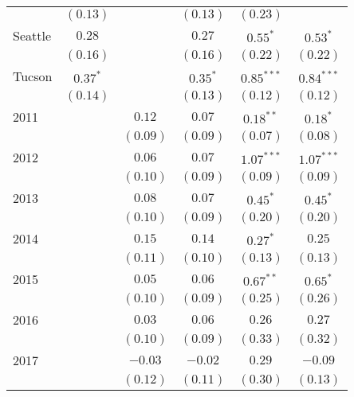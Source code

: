 \begin{table}[ht!]
\begin{center}
\begin{tabular}{l c c c c c}
                           & $(0.13)$    &              & $(0.13)$    & $(0.23)$     &              \\
Seattle                    & $0.28$      &              & $0.27$      & $0.55^{*}$   & $0.53^{*}$   \\
                           & $(0.16)$    &              & $(0.16)$    & $(0.22)$     & $(0.22)$     \\
Tucson                     & $0.37^{*}$  &              & $0.35^{*}$  & $0.85^{***}$ & $0.84^{***}$ \\
                           & $(0.14)$    &              & $(0.13)$    & $(0.12)$     & $(0.12)$     \\
2011                       &             & $0.12$       & $0.07$      & $0.18^{**}$  & $0.18^{*}$   \\
                           &             & $(0.09)$     & $(0.09)$    & $(0.07)$     & $(0.08)$     \\
2012                       &             & $0.06$       & $0.07$      & $1.07^{***}$ & $1.07^{***}$ \\
                           &             & $(0.10)$     & $(0.09)$    & $(0.09)$     & $(0.09)$     \\
2013                       &             & $0.08$       & $0.07$      & $0.45^{*}$   & $0.45^{*}$   \\
                           &             & $(0.10)$     & $(0.09)$    & $(0.20)$     & $(0.20)$     \\
2014                       &             & $0.15$       & $0.14$      & $0.27^{*}$   & $0.25$       \\
                           &             & $(0.11)$     & $(0.10)$    & $(0.13)$     & $(0.13)$     \\
2015                       &             & $0.05$       & $0.06$      & $0.67^{**}$  & $0.65^{*}$   \\
                           &             & $(0.10)$     & $(0.09)$    & $(0.25)$     & $(0.26)$     \\
2016                       &             & $0.03$       & $0.06$      & $0.26$       & $0.27$       \\
                           &             & $(0.10)$     & $(0.09)$    & $(0.33)$     & $(0.32)$     \\
2017                       &             & $-0.03$      & $-0.02$     & $0.29$       & $-0.09$      \\
                           &             & $(0.12)$     & $(0.11)$    & $(0.30)$     & $(0.13)$     \\

\end{tabular}
\end{center}
\end{table}
